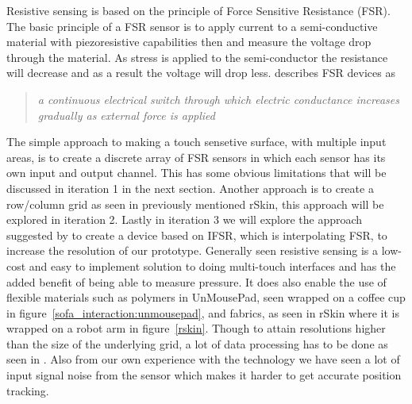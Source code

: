 Resistive sensing is based on the principle of Force Sensitive Resistance (FSR).
The basic principle of a FSR sensor is to apply current to a semi-conductive material with piezoresistive capabilities then and measure the voltage drop through the material.
As stress is applied to the semi-conductor the resistance will decrease and as a result the voltage will drop less. 
\citet{rosenberg2009unmousepad} describes FSR devices as 
\begin{quotation}
\emph{a continuous electrical switch through which electric conductance increases gradually as external force is applied}
\end{quotation}
The simple approach to making a touch sensetive surface, with multiple input areas, is to create a discrete array of FSR sensors in which each sensor has its own input and output channel.
This has some obvious limitations that will be discussed in iteration 1 in the next section.
Another approach is to create a row/column grid as seen in previously mentioned rSkin, this approach will be explored in iteration 2.
Lastly in iteration 3 we will explore the approach suggested by \citet{rosenberg2009unmousepad} to create a device based on IFSR, which is interpolating FSR, to increase the resolution of our prototype.
Generally seen resistive sensing is a low-cost and easy to implement solution to doing multi-touch interfaces and has the added benefit of being able to measure pressure.
It does also enable the use of flexible materials such as polymers in UnMousePad, seen wrapped on a coffee cup in figure~\ref{sofa_interaction:unmousepad}, and fabrics, as seen in rSkin where it is wrapped on a robot arm in figure~\ref{rskin}.
Though to attain resolutions higher than the size of the underlying grid, a lot of data processing has to be done as seen in \citep{rosenberg2009unmousepad}.
Also from our own experience with the technology we have seen a lot of input signal noise from the sensor which makes it harder to get accurate position tracking.   

